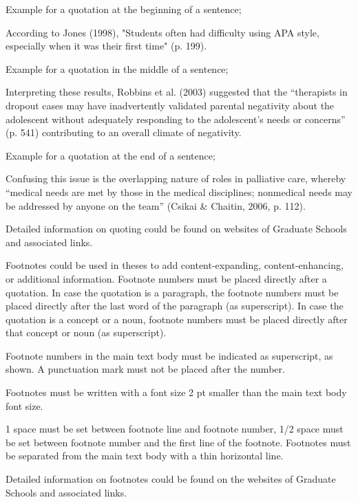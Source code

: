 Example for a quotation at the beginning of a sentence;

According to Jones (1998), "Students often had difficulty using APA style,  especially when it was their first time" (p. 199).

Example for a quotation in the middle of a sentence;

Interpreting these results, Robbins et al. (2003) suggested that the “therapists in dropout cases may have inadvertently validated parental negativity about the adolescent without adequately responding to the adolescent’s needs or concerns” (p. 541) contributing to an overall climate of negativity.

Example for a quotation at the end of a sentence;

Confusing this issue is the overlapping nature of roles in palliative care, whereby “medical needs are met by those in the medical disciplines; nonmedical needs may be addressed by anyone on the team” (Csikai \& Chaitin, 2006, p. 112). 

Detailed information on quoting could be found on websites of Graduate Schools and associated links.


Footnotes could be used in theses to add content-expanding, content-enhancing, or additional information. 
Footnote numbers must be placed directly after a quotation. In case the quotation is a paragraph, the footnote numbers must be placed directly after the last word of the paragraph (as superscript). In case the quotation is a concept or a noun, footnote numbers must be placed directly after that concept or noun (as superscript). 

Footnote numbers in the main text body must be indicated as superscript, as shown\footnotemark. A punctuation mark must not be placed after the number.

Footnotes must be written with a font size 2 pt smaller than the main text body font size.
 
1 space must be set between footnote line and footnote number, 1/2 space must be set between footnote number and the first line of the footnote. Footnotes must be separated from the main text body with a thin horizontal line. 

Detailed information on footnotes could be found on the websites of Graduate Schools and associated links.

